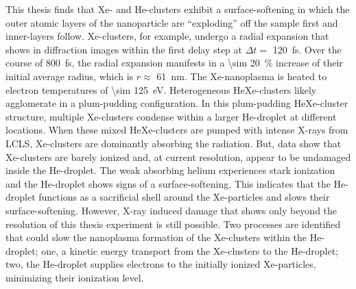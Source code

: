 %
This thesis finds that Xe- and He-clusters exhibit a surface-softening in which the outer atomic layers of the nanoparticle are ``exploding'' off the sample first and inner-layers follow. Xe-clusters, for example, undergo a radial expansion that shows in diffraction images within the first delay step at $\Delta t =$ \SI{120}{\femto\second}. Over the course of \SI{800}{\femto\second}, the radial expansion manifests in a \SI{\sim 20}{\percent} increase of their initial average radius, which is $r\approx$ \SI{61}{\nano\meter}. The Xe-nanoplasma is heated to electron temperatures of \SI{\sim 125}{\electronvolt}. Heterogeneous HeXe-clusters likely agglomerate in a plum-pudding configuration. In this plum-pudding HeXe-cluster structure, multiple Xe-clusters condense within a larger He-droplet at different locations. When these mixed HeXe-clusters are pumped with intense X-rays from LCLS, Xe-clusters are dominantly absorbing the radiation. But, data show that Xe-clusters are barely ionized and, at current resolution, appear to be undamaged inside the He-droplet. The weak absorbing helium experiences stark ionization and the He-droplet shows signs of a surface-softening. This indicates that the He-droplet functions as a sacrificial shell around the Xe-particles and slows their surface-softening. However, X-ray induced damage that shows only beyond the resolution of this thesis experiment is still possible. Two processes are identified that could slow the nanoplasma formation of the Xe-clusters within the He-droplet; one, a kinetic energy transport from the Xe-clusters to the He-droplet; two, the He-droplet supplies electrons to the initially ionized Xe-particles, minimizing their ionization level.\\[0.5\baselineskip]
%
